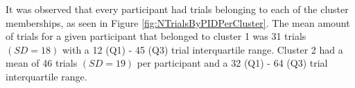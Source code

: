 \documentclass[man, floatsintext]{apa7}
\begin{document}
It was observed that every participant had trials belonging to each of the cluster memberships, as seen in Figure \ref{fig:NTrialsByPIDPerCluster}. The mean amount of trials for a given participant that belonged to cluster 1 was 31 trials $(SD = 18)$ with a 12 (Q1) - 45 (Q3) trial interquartile range. Cluster 2 had a mean of 46 trials $(SD = 19)$ per participant and a 32 (Q1) - 64 (Q3) trial interquartile range. 





%
%
%
%
%
\end{document}
